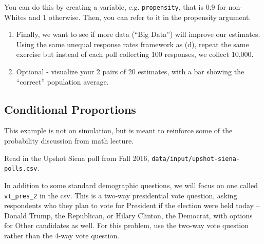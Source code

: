 \documentclass[]{book}
\theoremstyle{definition}
\theoremstyle{definition}
\theoremstyle{definition}
\theoremstyle{remark}
\begin{document}
You can do this by creating a variable, e.g. \texttt{propensity}, that is 0.9 for non-Whites and 1 otherwise. Then, you can refer to it in the propensity argument.

\begin{enumerate}
\def\labelenumi{(\alph{enumi})}
\setcounter{enumi}{4}
\item
  Finally, we want to see if more data (``Big Data'') will improve our estimates. Using the same unequal response rates framework as (d), repeat the same exercise but instead of each poll collecting 100 responses, we collect 10,000.
\item
  Optional - visualize your 2 pairs of 20 estimates, with a bar showing the ``correct'' population average.
\end{enumerate}

\hypertarget{conditional-proportions}{%
\subsection*{Conditional Proportions}\label{conditional-proportions}}

This example is not on simulation, but is meant to reinforce some of the probability discussion from math lecture.

Read in the Upshot Siena poll from Fall 2016, \texttt{data/input/upshot-siena-polls.csv}.

In addition to some standard demographic questions, we will focus on one called \texttt{vt\_pres\_2} in the csv. This is a two-way presidential vote question, asking respondents who they plan to vote for President if the election were held today -- Donald Trump, the Republican, or Hilary Clinton, the Democrat, with options for Other candidates as well. For this problem, use the two-way vote question rather than the 4-way vote question.
\end{document}
